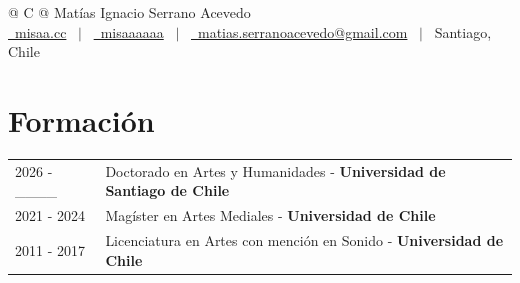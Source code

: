 \documentclass[a4paper,11pt]{article}
\begin{document}
\pagestyle{empty} 



\begin{tabularx}{\linewidth}{@{} C @{}}
\Huge{Matías Ignacio Serrano Acevedo} \\[7.5pt]

\href{https://misaa.cc}{\faGlobe \ misaa.cc} \ $|$ \
\href{https://github.com/misaaaaaa}{\faGithub\ misaaaaaa} \ $|$ \ 
\href{mailto:matias.serranoacevedo@gmail.com}{\faEnvelope \ matias.serranoacevedo@gmail.com} \ $|$ \
{Santiago, Chile} \\
\end{tabularx}




\section{Formación}
\begin{tabularx}{\linewidth}{@{}l X@{}}	
2026 - \_\_\_\_ & Doctorado en Artes y Humanidades - \textbf{Universidad de Santiago de Chile} \hfill \normalsize  \\

2021 - 2024 & Magíster en Artes Mediales - \textbf{Universidad de Chile} \hfill \normalsize  \\

2011 - 2017 & Licenciatura en Artes con mención en Sonido - \textbf{Universidad de Chile} \hfill  \\ 


\end{tabularx}
\end{document}
